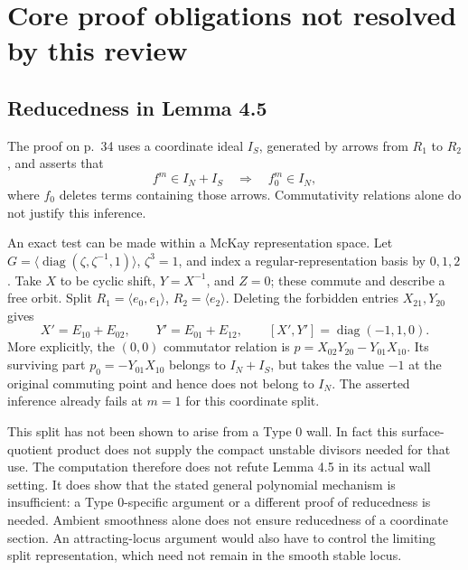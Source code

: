 \documentclass[10pt]{article}
\begin{document}
\section*{Core proof obligations not resolved by this review}
\subsection*{Reducedness in Lemma 4.5}
The proof on p. 34 uses a coordinate ideal \(I_S\), generated by arrows from \(R_1\) to \(R_2\), and asserts that \[f^m\in I_N+I_S\quad\Longrightarrow\quad f_0^m\in I_N,\] where \(f_0\) deletes terms containing those arrows. Commutativity relations alone do not justify this inference.\par
An exact test can be made within a McKay representation space. Let \(G=\langle\operatorname{diag}(\zeta,\zeta^{-1},1)\rangle\), \(\zeta^3=1\), and index a regular-representation basis by \(0,1,2\). Take \(X\) to be cyclic shift, \(Y=X^{-1}\), and \(Z=0\); these commute and describe a free orbit. Split \(R_1=\langle e_0,e_1\rangle\), \(R_2=\langle e_2\rangle\). Deleting the forbidden entries \(X_{21},Y_{20}\) gives \[X'=E_{10}+E_{02},\qquad Y'=E_{01}+E_{12},
 \qquad [X',Y']=\operatorname{diag}(-1,1,0).\] More explicitly, the \((0,0)\) commutator relation is \(p=X_{02}Y_{20}-Y_{01}X_{10}\). Its surviving part \(p_0=-Y_{01}X_{10}\) belongs to \(I_N+I_S\), but takes the value \(-1\) at the original commuting point and hence does not belong to \(I_N\). The asserted inference already fails at \(m=1\) for this coordinate split.\par
This split has not been shown to arise from a Type 0 wall. In fact this surface-quotient product does not supply the compact unstable divisors needed for that use. The computation therefore does not refute Lemma 4.5 in its actual wall setting. It does show that the stated general polynomial mechanism is insufficient: a Type 0-specific argument or a different proof of reducedness is needed. Ambient smoothness alone does not ensure reducedness of a coordinate section. An attracting-locus argument would also have to control the limiting split representation, which need not remain in the smooth stable locus.\par
\end{document}
